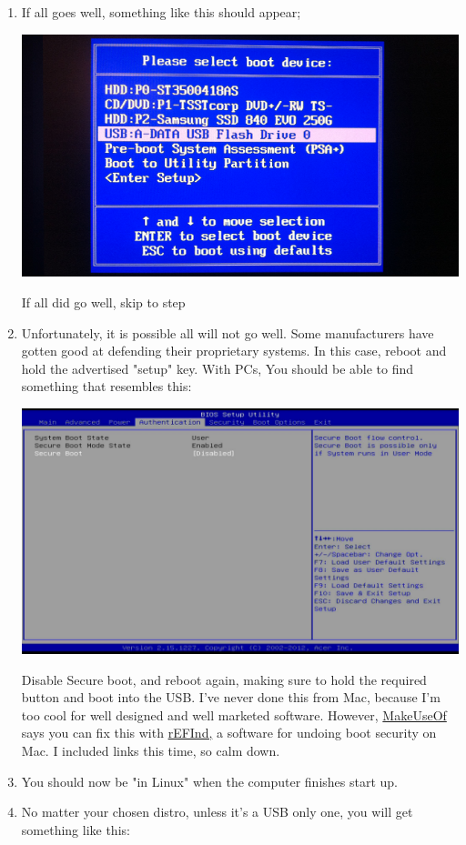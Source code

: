 \documentclass{book}
\begin{document}
\begin{enumerate}
    \item If all goes well, something like this should appear;
    
    \includegraphics[scale=0.4]{options.png}

    If all did go well, skip to step 
    
    \item Unfortunately, it is possible all will not go well. Some manufacturers have gotten good at defending their proprietary systems. In this case, reboot and hold the advertised "setup" key. With PCs, You should be able to find something that resembles this:

    \includegraphics[scale=0.17]{secboot.jpg}
    
    Disable Secure boot, and reboot again, making sure to hold the required button and boot into the USB.
    I've never done this from Mac, because I'm too cool for well designed and well marketed software. However, \href{https://www.makeuseof.com/tag/install-linux-macbook-pro/} {MakeUseOf} says you can fix this with \href{https://sourceforge.net/projects/refind/}{rEFInd,} a software for undoing boot security on Mac. I included links this time, so calm down. 
    \item You should now be "in Linux" when the computer finishes start up. 
    \item No matter your chosen distro, unless it's a USB only one, you will get something like this:
    

\end{enumerate}
\end{document}
